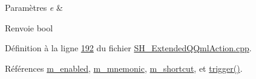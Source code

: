 \begin{DoxyParams}{Paramètres}
{\em e} & \\
\hline
\end{DoxyParams}
\begin{DoxyReturn}{Renvoie}
bool 
\end{DoxyReturn}


Définition à la ligne \hyperlink{SH__ExtendedQQmlAction_8cpp_source_l00192}{192} du fichier \hyperlink{SH__ExtendedQQmlAction_8cpp_source}{S\-H\-\_\-\-Extended\-Q\-Qml\-Action.\-cpp}.



Références \hyperlink{classSH__ExtendedQQmlAction_ad93920806001da9e32b7b2a3d3d9213e}{m\-\_\-enabled}, \hyperlink{classSH__ExtendedQQmlAction_a7c924c07aa50a7228b6e8f31c4520896}{m\-\_\-mnemonic}, \hyperlink{classSH__ExtendedQQmlAction_ac84d3a2113efb715321b905580b08bc5}{m\-\_\-shortcut}, et \hyperlink{classSH__ExtendedQQmlAction_abf79bb6cb923d27e2fc5dfc05ff513c2}{trigger()}.


